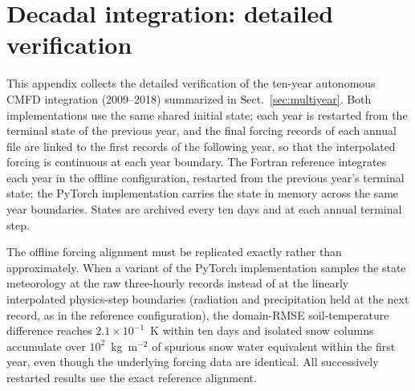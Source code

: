 \appendix

\section{Decadal integration: detailed verification}
\label{app:multiyear}

This appendix collects the detailed verification of the ten-year
autonomous CMFD integration (2009--2018) summarized in
Sect.~\ref{sec:multiyear}. Both implementations use the same shared initial
state; each year is restarted from the terminal state of the previous year,
and the final forcing records of each annual file are linked to the first
records of the following year, so that the interpolated forcing is
continuous at each year boundary. The Fortran reference integrates each year
in the offline configuration, restarted from the previous year's terminal
state; the PyTorch implementation carries the state in memory across the
same year boundaries. States are archived every ten days and at each annual
terminal step.

The offline forcing alignment must be replicated exactly rather than
approximately. When a variant of the PyTorch implementation samples the state meteorology
at the raw three-hourly records instead of at the linearly interpolated
physics-step boundaries (radiation and precipitation held at the next
record, as in the reference configuration), the domain-RMSE soil-temperature
difference reaches $2.1\times10^{-1}$~K within ten days and isolated snow
columns accumulate over $10^{2}$~kg~m$^{-2}$ of spurious snow water
equivalent within the first year, even though the underlying forcing data
are identical. All successively restarted results use the exact reference alignment.


